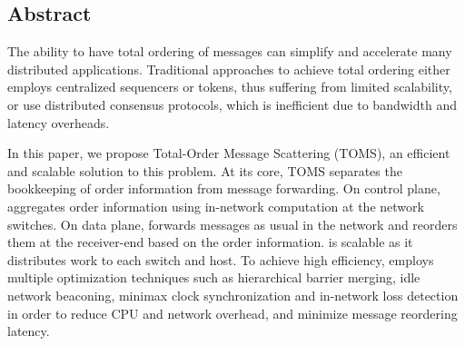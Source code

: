 \subsection*{Abstract}

The ability to have total ordering of messages can simplify and accelerate many distributed applications. Traditional approaches to achieve total ordering either employs centralized sequencers or tokens, thus suffering from limited scalability, or use distributed consensus protocols, which is inefficient due to bandwidth and latency overheads.

In this paper, we propose Total-Order Message Scattering (TOMS), an efficient and scalable solution to this problem. At its core, TOMS separates the bookkeeping of order information from message forwarding. On control plane, \sys aggregates order information using in-network computation at the network switches. On data plane, \sys forwards messages as usual in the network and reorders them at the receiver-end based on the order information. \sys is scalable as it distributes work to each switch and host. To achieve high efficiency, \sys employs multiple optimization techniques such as hierarchical barrier merging, idle network beaconing, minimax clock synchronization and in-network loss detection in order to reduce CPU and network overhead, and minimize message reordering latency.





